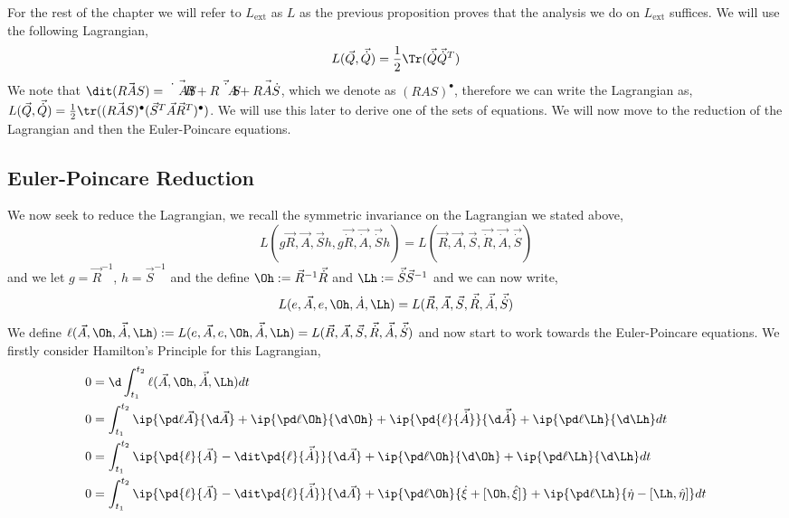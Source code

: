 \noindent
For the rest of the chapter we will refer to $L_\text{ext}$ as $L$ as the previous proposition proves that the analysis we do on $L_\text{ext}$ suffices. We will use the following Lagrangian,
$$ L(\vec Q, \vec{\dot Q}) = \frac{1}{2}\Tr(\vec{\dot Q}\vec{\dot Q}^T) $$
We note that $\dit (\vec{RAS}) = \vec{\dot RAS} + \vec{R\dot AS} + \vec{RA\dot S}$, which we denote as $(RAS)^{\bullet}$, therefore we can write the Lagrangian as, $L(\vec Q, \vec{\dot Q}) = \frac{1}{2}\tr((\vec{RAS})^\bullet (\vec S^T\vec A\vec R^T)^\bullet)$. We will use this later to derive one of the sets of equations. We will now move to the reduction of the Lagrangian and then the Euler-Poincare equations.

\subsection{Euler-Poincare Reduction}
We now seek to reduce the Lagrangian, we recall the symmetric invariance on the Lagrangian we stated above,
$$ L(g\vec R, \vec A, \vec Sh, g\vec{\dot R}, \vec{\dot A}, \vec{\dot S}h) = L(\vec R, \vec A, \vec S, \vec{\dot R}, \vec{\dot A}, \vec{\dot S}) $$
and we let $g = \vec R^{-1}$, $h = \vec S^{-1}$ and the define $\Oh := \vec R^{-1}\vec{\dot R}$ and $\Lh := \vec{\dot S}\vec S^{-1}$ and we can now write,
$$ L(e, \vec A, e, \Oh, \dot A, \Lh) = L(\vec R, \vec A, \vec S, \vec{\dot R}, \vec{\dot A}, \vec{\dot S}) $$
We define $\ell(\vec A, \Oh, \vec{\dot A}, \Lh) := L(e, \vec A, e, \Oh, \vec{\dot A}, \Lh) = L(\vec R, \vec A, \vec S, \vec{\dot R}, \vec{\dot A}, \vec{\dot S})$ and now start to work towards the Euler-Poincare equations. We firstly consider Hamilton's Principle for this Lagrangian,
\begin{align*}
  0 &= \d \int_{t_1}^{t_2} \ell(\vec A, \Oh, \vec{\dot A}, \Lh)dt \\
  0 &= \int_{t_1}^{t_2} \ip{\pd \ell {\vec A}}{\d \vec A} + \ip{\pd \ell \Oh}{\d \Oh} + \ip{\pd{\ell}{\vec{\dot A}}}{\d \vec{\dot A}} + \ip{\pd \ell \Lh}{\d\Lh}dt \\
  0 &= \int_{t_1}^{t_2} \ip{\pd{\ell}{\vec A} - \dit\pd{\ell}{\vec{\dot A}}}{\d \vec A} + \ip{\pd \ell \Oh}{\d \Oh} + \ip{\pd \ell \Lh}{\d\Lh}dt \\
  0 &= \int_{t_1}^{t_2} \ip{\pd{\ell}{\vec A} - \dit\pd{\ell}{\vec{\dot A}}}{\d \vec A} + \ip{\pd \ell \Oh}{\dot \xi + [\Oh, \hat\xi]} + \ip{\pd \ell \Lh}{\dot \eta - [\Lh, \hat \eta]}dt \\
\end{align*}
